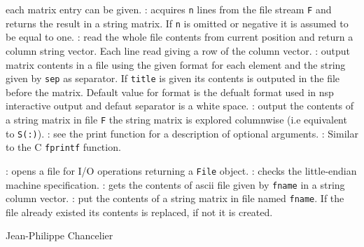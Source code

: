 \begin{itemize}
  each matrix entry can be given. 
  : acquires \verb+n+ lines from the file stream \verb+F+ and returns 
  the result in a string matrix. If \verb+n+ is omitted or negative it is assumed to be equal to 
  one. 
  : read the whole file contents from current position
  and return a column string vector. Each line read giving a row of the column vector.
  : 
    output  matrix contents in a file using the given format for each element 
    and the string given by \verb+sep+ as separator. If \verb+title+ is given 
    its contents is outputed in the file before the matrix. Default value 
    for format is the defualt format used in nsp interactive output and defaut 
    separator is a white space.
  : output the contents of a string matrix in file \verb+F+ 
  the string matrix is explored columnwise (i.e equivalent to \verb+S(:)+).
  : 
  see the print function for a description of optional arguments.
  : Similar to the C \verb+fprintf+ function. 
\end{itemize}

\begin{itemize}
  : opens a file for I/O operations returning a \verb+File+ object.
  : checks the little-endian machine specification.
  : gets the contents of ascii file given by \verb+fname+ 
  in a string column vector.
  : put the contents of a string matrix in file named 
  \verb+fname+. If the file already existed its contents is replaced, if not it is 
  created. 
\end{itemize}

\begin{examples}
  \begin{program}
  \end{program}
\end{examples}

\begin{manseealso}
\end{manseealso}

\begin{authors}
  Jean-Philippe Chancelier 
\end{authors}

